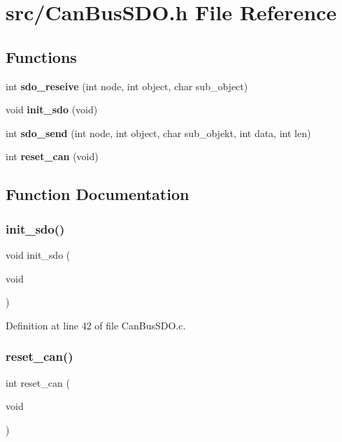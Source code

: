 \section{src/\+Can\+Bus\+S\+DO.h File Reference}
\label{_can_bus_s_d_o_8h}
\subsection*{Functions}
\begin{DoxyCompactItemize}
\item 
int \textbf{ sdo\+\_\+reseive} (int node, int object, char sub\+\_\+object)
\item 
void \textbf{ init\+\_\+sdo} (void)
\item 
int \textbf{ sdo\+\_\+send} (int node, int object, char sub\+\_\+objekt, int data, int len)
\item 
int \textbf{ reset\+\_\+can} (void)
\end{DoxyCompactItemize}


\subsection{Function Documentation}
\mbox{\label{_can_bus_s_d_o_8h_a87fc19cbb8a9e65a095afdc9f03db6c6}} 
\subsubsection{init\+\_\+sdo()}
{\footnotesize\ttfamily void init\+\_\+sdo (\begin{DoxyParamCaption}\item[{void}]{ }\end{DoxyParamCaption})}



Definition at line 42 of file Can\+Bus\+S\+D\+O.\+c.

\mbox{\label{_can_bus_s_d_o_8h_a5a392245f62ad9b5c3a378af626249b1}} 
\subsubsection{reset\+\_\+can()}
{\footnotesize\ttfamily int reset\+\_\+can (\begin{DoxyParamCaption}\item[{void}]{ }\end{DoxyParamCaption})}



